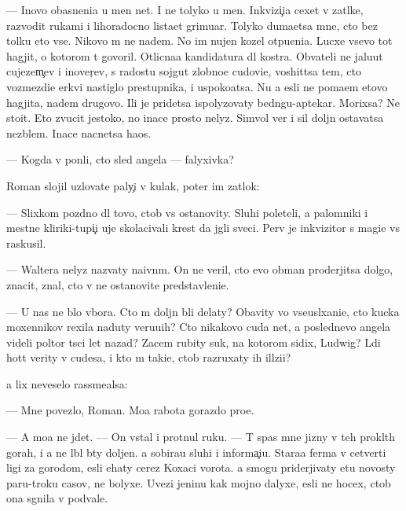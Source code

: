 \documentclass[10pt]{book}
\begin{document}
— Inovo ob{\y}asneni{\y}a u men{\ia} net. I ne tolyko u men{\ia}. Inkvizi{\c}i{\y}a cexet v zat{\yi}lke, razvodit rukami i lihoradocno lista{\y}et grimuar{\yi}. Tolyko duma{\y}etsa mne, cto bez tolku eto vse. Nikovo m{\yi} ne na{\y}dem. No im nujen kozel otpu{\x}eni{\y}a. Lucxe vsevo tot hagjit, o kotorom t{\yi} govoril. Otlicna{\y}a kandidatura dl{\ia} kostra. Ob{\yi}vateli ne jalu{\y}ut cujezem{\c}ev i inover{\c}ev, s radost{\y}u sojgut zlobno{\y}e cudovi{\x}e, voshit{\ia}tsa tem, cto vozmezdi{\y}e {\C}erkvi nastiglo prestupnika, i uspoko{\y}atsa. Nu a {\y}esli ne po{\y}ma{\y}em etovo hagjita, na{\y}dem drugovo. Ili je pridetsa ispolyzovaty bedn{\ia}gu-aptekar{\ia}. Mor{\x}ixsa? Ne sto{\y}it. Eto zvucit jestoko, no inace prosto nelyz{\ia}. Simvol{\yi} ver{\yi} i sil{\yi} doljn{\yi} ostavatsa nez{\yi}blem{\yi}. Inace nacnetsa haos.

— Kogda v{\yi} pon{\ia}li, cto sled angela — falyxivka?

Roman slojil uzlovat{\yi}{\y}e paly{\c}i v kulak, poter im zat{\yi}lok:

— Slixkom pozdno dl{\ia} tovo, ctob{\yi} vs{\e} ostanovity. Sluhi poleteli, a palomniki i mestn{\yi}{\y}e kliriki-tupi{\c}i uje skolacivali krest da jgli sveci. Perv{\yi}{\y} je inkvizitor s magi{\y}e{\y} vs{\e} raskusil.

— Waltera nelyz{\ia} nazvaty naivn{\yi}m. On ne veril, cto {\y}evo obman proderjitsa dolgo, znacit, znal, cto v{\yi} ne ostanovite predstavleni{\y}e.

— U nas ne b{\yi}lo v{\yi}bora. Cto m{\yi} doljn{\yi} b{\yi}li delaty? Ob{\y}avity vo vseusl{\yi}xani{\y}e, cto kucka moxennikov rexila naduty veru{\y}u{\x}ih? Cto nikakovo cuda net, a poslednevo angela videli poltor{\yi} t{\yi}s{\ia}ci let nazad? Zacem rubity suk, na kotorom sidix, Ludwig? L{\iu}di hot{\ia}t verity v cudesa, i kto m{\yi} taki{\y}e, ctob{\yi} razruxaty ih ill{\iu}zi{\y}i?

{\Y}a lix neveselo rassme{\y}alsa:

— Mne povezlo, Roman. Mo{\y}a rabota gorazdo pro{\x}e.

— A mo{\y}a ne jdet. — On vstal i prot{\ia}nul ruku. — T{\yi} spas mne jizny v teh prokl{\ia}t{\yi}h gorah, i {\y}a ne l{\iu}bl{\iu} b{\yi}ty doljen. {\Y}a sobira{\y}u sluhi i informa{\c}i{\y}u. Stara{\y}a ferma v cetverti ligi za gorodom, {\y}esli {\y}ehaty cerez Koxac{\yf}i vorota. {\Y}a smogu priderjivaty etu novosty paru-tro{\y}ku casov, ne bolyxe. Uvezi jen{\x}inu kak mojno dalyxe, {\y}esli ne hocex, ctob{\yi} ona sgnila v podvale.
\end{document}
